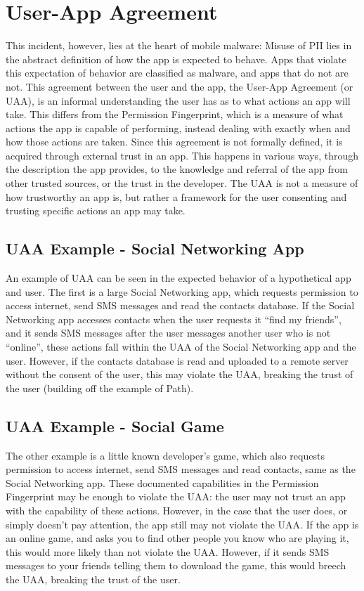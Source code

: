 \section{User-App Agreement}
This incident, however, lies at the heart of mobile malware: Misuse of PII lies in the abstract definition of how the app is expected to behave. Apps that violate this expectation of behavior are classified as malware, and apps that do not are not. This agreement between the user and the app, the User-App Agreement (or UAA), is an informal understanding the user has as to what actions an app will take. This differs from the Permission Fingerprint, which is a measure of what actions the app is capable of performing, instead dealing with exactly when and how those actions are taken. Since this agreement is not formally defined, it is acquired through external trust in an app. This happens in various ways, through the description the app provides, to the knowledge and referral of the app from other trusted sources, or the trust in the developer. The UAA is not a measure of how trustworthy an app is, but rather a framework for the user consenting and trusting specific actions an app may take.

\subsection{UAA Example - Social Networking App}
An example of UAA can be seen in the expected behavior of a hypothetical app and user. The first is a large Social Networking app, which requests permission to access internet, send SMS messages and read the contacts database. If the Social Networking app accesses contacts when the user requests it ``find my friends'', and it sends SMS messages after the user messages another user who is not ``online'', these actions fall within the UAA of the Social Networking app and the user. However, if the contacts database is read and uploaded to a remote server without the consent of the user, this may violate the UAA, breaking the trust of the user (building off the example of Path). 

\subsection{UAA Example - Social Game}
The other example is a little known developer's game, which also requests permission to access internet, send SMS messages and read contacts, same as the Social Networking app. These documented capabilities in the Permission Fingerprint may be enough to violate the UAA: the user may not trust an app with the capability of these actions. However, in the case that the user does, or simply doesn't pay attention, the app still may not violate the UAA. If the app is an online game, and asks you to find other people you know who are playing it, this would more likely than not violate the UAA. However, if it sends SMS messages to your friends telling them to download the game, this would breech the UAA, breaking the trust of the user.

